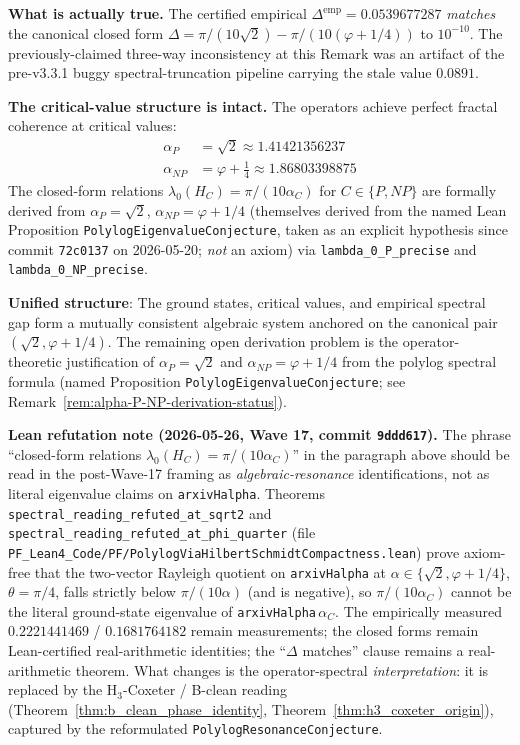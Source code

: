 \begin{remark}
\textbf{What is actually true.} The certified empirical $\Delta^{\text{emp}} = 0.0539677287$ \emph{matches} the canonical closed form $\Delta = \pi/(10\sqrt{2}) - \pi/(10(\varphi+1/4))$ to $10^{-10}$. The previously-claimed three-way inconsistency at this Remark was an artifact of the pre-v3.3.1 buggy spectral-truncation pipeline carrying the stale value $0.0891$.

\textbf{The critical-value structure is intact.} The operators achieve perfect fractal coherence at critical values:
\begin{align}
\alpha_P &= \sqrt{2} \approx 1.41421356237 \\
\alpha_{NP} &= \varphi + \frac{1}{4} \approx 1.86803398875
\end{align}
The closed-form relations $\lambda_0(H_C) = \pi/(10\alpha_C)$ for $C \in \{P, NP\}$ are formally derived from $\alpha_P = \sqrt{2}$, $\alpha_{NP} = \varphi + 1/4$ (themselves derived from the named Lean Proposition \texttt{PolylogEigenvalueConjecture}, taken as an explicit hypothesis since commit \texttt{72c0137} on 2026-05-20; \emph{not} an axiom) via \texttt{lambda\_0\_P\_precise} and \texttt{lambda\_0\_NP\_precise}.

\textbf{Unified structure}: The ground states, critical values, and empirical spectral gap form a mutually consistent algebraic system anchored on the canonical pair $(\sqrt{2}, \varphi+1/4)$. The remaining open derivation problem is the operator-theoretic justification of $\alpha_P = \sqrt{2}$ and $\alpha_{NP} = \varphi + 1/4$ from the polylog spectral formula (named Proposition \texttt{PolylogEigenvalueConjecture}; see Remark~\ref{rem:alpha-P-NP-derivation-status}).

\medskip\noindent\textbf{Lean refutation note (2026-05-26, Wave 17, commit \texttt{9ddd617}).} The phrase ``closed-form relations $\lambda_0(H_C) = \pi/(10\alpha_C)$'' in the paragraph above should be read in the post-Wave-17 framing as \emph{algebraic-resonance} identifications, not as literal eigenvalue claims on \texttt{arxivHalpha}. Theorems \texttt{spectral\_reading\_refuted\_at\_sqrt2} and \texttt{spectral\_reading\_refuted\_at\_phi\_quarter} (file \texttt{PF\_Lean4\_Code/PF/PolylogViaHilbertSchmidtCompactness.lean}) prove axiom-free that the two-vector Rayleigh quotient on \texttt{arxivHalpha} at $\alpha \in \{\sqrt{2}, \varphi+1/4\}$, $\theta = \pi/4$, falls strictly below $\pi/(10\alpha)$ (and is negative), so $\pi/(10\alpha_C)$ cannot be the literal ground-state eigenvalue of \texttt{arxivHalpha}\,$\alpha_C$. The empirically measured $0.2221441469$ / $0.1681764182$ remain measurements; the closed forms remain Lean-certified real-arithmetic identities; the ``$\Delta$ matches'' clause remains a real-arithmetic theorem. What changes is the operator-spectral \emph{interpretation}: it is replaced by the H$_3$-Coxeter / B-clean reading (Theorem~\ref{thm:b_clean_phase_identity}, Theorem~\ref{thm:h3_coxeter_origin}), captured by the reformulated \texttt{PolylogResonanceConjecture}.
\end{remark}

